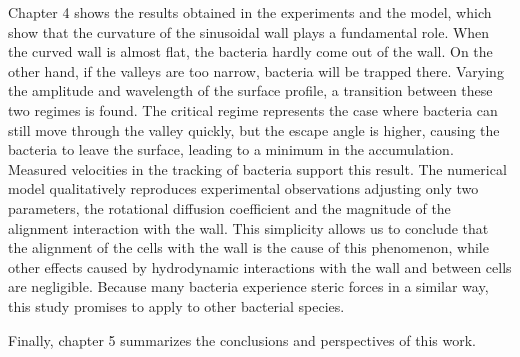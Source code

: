 Chapter 4 shows the results obtained in the experiments and the model, which show that the curvature of the sinusoidal wall plays a fundamental role. When the curved wall is almost flat, the bacteria hardly come out of the wall. On the other hand, if the valleys are too narrow, bacteria will be trapped there. Varying the amplitude and wavelength of the surface profile, a transition between these two regimes is found. The critical regime represents the case where bacteria can still move through the valley quickly, but the escape angle is higher, causing the bacteria to leave the surface, leading to a minimum in the accumulation. Measured velocities in the tracking of bacteria support this result. The numerical model qualitatively reproduces experimental observations adjusting only two parameters, the rotational diffusion coefficient and the magnitude of the alignment interaction with the wall. This simplicity allows us to conclude that the alignment of the cells with the wall is the cause of this phenomenon, while other effects caused by hydrodynamic interactions with the wall and between cells are negligible. Because many bacteria experience steric forces in a similar way, this study promises to apply to other bacterial species. 

Finally, chapter 5 summarizes the conclusions and perspectives of this work. 


\newpage